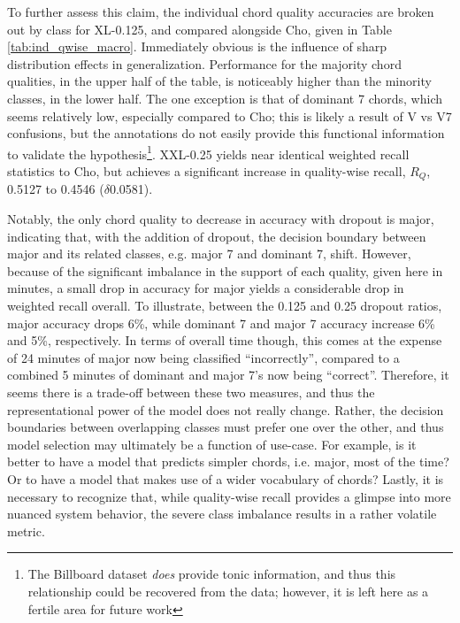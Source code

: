 To further assess this claim, the individual chord quality accuracies are broken out by class for XL-0.125, and compared alongside Cho, given in Table \ref{tab:ind_qwise_macro}.
Immediately obvious is the influence of sharp distribution effects in generalization.
Performance for the majority chord qualities, in the upper half of the table, is noticeably higher than the minority classes, in the lower half.
The one exception is that of dominant 7 chords, which seems relatively low, especially compared to Cho;
this is likely a result of V vs V7 confusions, but the annotations do not easily provide this functional information to validate the hypothesis\footnote{The Billboard dataset \emph{does} provide tonic information, and thus this relationship could be recovered from the data; however, it is left here as a fertile area for future work}.
XXL-0.25 yields near identical weighted recall statistics to Cho, but achieves a significant increase in quality-wise recall, $R_{Q}$, 0.5127 to 0.4546 ($\delta$0.0581).


Notably, the only chord quality to decrease in accuracy with dropout is major, indicating that, with the addition of dropout, the decision boundary between major and its related classes, e.g. major 7 and dominant 7, shift.
However, because of the significant imbalance in the support of each quality, given here in minutes, a small drop in accuracy for major yields a considerable drop in weighted recall overall.
To illustrate, between the 0.125 and 0.25 dropout ratios, major accuracy drops 6\%, while dominant 7 and major 7 accuracy increase 6\% and 5\%, respectively.
In terms of overall time though, this comes at the expense of 24 minutes of major now being classified ``incorrectly'', compared to a combined 5 minutes of dominant and major 7's now being ``correct''.
Therefore, it seems there is a trade-off between these two measures, and thus the representational power of the model does not really change.
Rather, the decision boundaries between overlapping classes must prefer one over the other, and thus model selection may ultimately be a function of use-case.
For example, is it better to have a model that predicts simpler chords, i.e. major, most of the time? Or to have a model that makes use of a wider vocabulary of chords?
Lastly, it is necessary to recognize that, while quality-wise recall provides a glimpse into more nuanced system behavior, the severe class imbalance results in a rather volatile metric.



